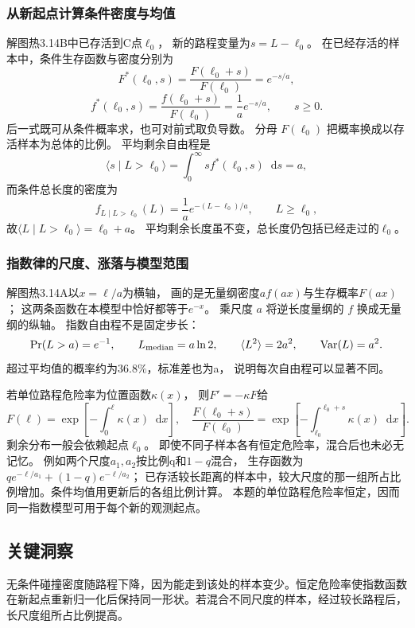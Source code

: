 \documentclass[UTF8,fontset=fandol,a4paper,11pt]{ctexart}
\newcommand{\dd}{\mathop{}\!\mathrm{d}}
\begin{document}
\subsubsection*{从新起点计算条件密度与均值}
解图热3.14B中已存活到C点$\ell_0$，
新的路程变量为$s=L-\ell_0$。
在已经存活的样本中，条件生存函数与密度分别为
\[
F^*(\ell_0,s)=\frac{F(\ell_0+s)}{F(\ell_0)}
=e^{-s/a},
\]
\[
f^*(\ell_0,s)=\frac{f(\ell_0+s)}{F(\ell_0)}
=\frac1a e^{-s/a},\qquad s\ge0.
\]
后一式既可从条件概率求，也可对前式取负导数。
分母 $F(\ell_0)$ 把概率换成以存活样本为总体的比例。
平均剩余自由程是
\[
\langle s\mid L>\ell_0\rangle
=\int_0^\infty s f^*(\ell_0,s)\dd s=a,
\]
而条件总长度的密度为
\[
f_{L\mid L>\ell_0}(L)
=\frac1a e^{-(L-\ell_0)/a},\qquad L\ge\ell_0,
\]
故$\langle L\mid L>\ell_0\rangle=\ell_0+a$。
平均剩余长度虽不变，总长度仍包括已经走过的$\ell_0$。

\subsubsection*{指数律的尺度、涨落与模型范围}
解图热3.14A以$x=\ell/a$为横轴，
画的是无量纲密度$a f(ax)$与生存概率$F(ax)$；
这两条函数在本模型中恰好都等于$e^{-x}$。
乘尺度 $a$ 将逆长度量纲的 $f$ 换成无量纲的纵轴。
指数自由程不是固定步长：
\[
\Pr(L>a)=e^{-1},\qquad
L_{\rm median}=a\ln2,\qquad
\langle L^2\rangle=2a^2,\qquad
\operatorname{Var}(L)=a^2.
\]
超过平均值的概率约为$36.8\%$，标准差也为a，
说明每次自由程可以显著不同。

若单位路程危险率为位置函数$\kappa(x)$，
则$F'=-\kappa F$给
\[
F(\ell)=\exp\left[-\int_0^\ell\kappa(x)\dd x\right],
\quad
\frac{F(\ell_0+s)}{F(\ell_0)}
=\exp\left[-\int_{\ell_0}^{\ell_0+s}\kappa(x)\dd x\right].
\]
剩余分布一般会依赖起点$\ell_0$。
即使不同子样本各有恒定危险率，混合后也未必无记忆。
例如两个尺度$a_1,a_2$按比例q和$1-q$混合，
生存函数为$q e^{-\ell/a_1}+(1-q)e^{-\ell/a_2}$；
已存活较长距离的样本中，较大尺度的那一组所占比例增加。条件均值用更新后的各组比例计算。
本题的单位路程危险率恒定，因而同一指数模型可用于每个新的观测起点。




\subsection*{关键洞察}

无条件碰撞密度随路程下降，因为能走到该处的样本变少。恒定危险率使指数函数在新起点重新归一化后保持同一形状。若混合不同尺度的样本，经过较长路程后，长尺度组所占比例提高。
\end{document}
